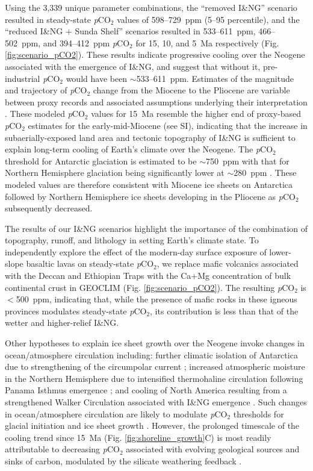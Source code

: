 \documentclass[11pt,letterpaper]{article}
\newcommand{\pCOtwo}{\textit{p}CO$_{2}$\xspace}
\begin{document}
Using the 3,339 unique parameter combinations, the ``removed I\&NG'' scenario resulted in steady-state \pCOtwo values of 598--729~ppm (5--95 percentile), and the ``reduced I\&NG + Sunda Shelf'' scenarios resulted in 533--611~ppm, 466--502~ppm, and 394--412~ppm \pCOtwo for 15, 10, and 5~Ma respectively (Fig. \ref{fig:scenario_pCO2}). These results indicate progressive cooling over the Neogene associated with the emergence of I\&NG, and suggest that without it, pre-industrial \pCOtwo would have been $\sim$533--611~ppm. Estimates of the magnitude and trajectory of \pCOtwo change from the Miocene to the Pliocene are variable between proxy records and associated assumptions underlying their interpretation \cite{Foster2017a, Mejia2017a, Ji2018a}. These modeled \pCOtwo values for 15~Ma resemble the higher end of proxy-based \pCOtwo estimates for the early-mid-Miocene (see SI), indicating that the increase in subaerially-exposed land area and tectonic topography of I\&NG is sufficient to explain long-term cooling of Earth's climate over the Neogene. The \pCOtwo threshold for Antarctic glaciation is estimated to be $\sim$750~ppm with that for Northern Hemisphere glaciation being significantly lower at $\sim$280~ppm \cite{DeConto2008a}. These modeled values are therefore consistent with Miocene ice sheets on Antarctica followed by Northern Hemisphere ice sheets developing in the Pliocene as \pCOtwo subsequently decreased.

The results of our I\&NG scenarios highlight the importance of the combination of topography, runoff, and lithology in setting Earth’s climate state. To independently explore the effect of the modern-day surface exposure of lower-slope basaltic lavas on steady-state \pCOtwo \cite{Kent2008a, Kent2013a}, we replace mafic volcanics associated with the Deccan and Ethiopian Traps with the Ca+Mg concentration of bulk continental crust in GEOCLIM (Fig. \ref{fig:scenario_pCO2}). The resulting \pCOtwo is $<$500~ppm, indicating that, while the presence of mafic rocks in these igneous provinces modulates steady-state \pCOtwo, its contribution is less than that of the wetter and higher-relief I\&NG.

Other hypotheses to explain ice sheet growth over the Neogene invoke changes in ocean/atmosphere circulation including: further climatic isolation of Antarctica due to strengthening of the circumpolar current \cite{Shevenell2004a}; increased atmospheric moisture in the Northern Hemisphere due to intensified thermohaline circulation following Panama Isthmus emergence \cite{Haug1998a}; and cooling of North America resulting from a strengthened Walker Circulation associated with I\&NG emergence \cite{Molnar2015a}. Such changes in ocean/atmosphere circulation are likely to modulate \pCOtwo thresholds for glacial initiation and ice sheet growth \cite{DeConto2008a}. However, the prolonged timescale of the cooling trend since 15~Ma (Fig. \ref{fig:shoreline_growth}C) is most readily attributable to decreasing \pCOtwo associated with evolving geological sources and sinks of carbon, modulated by the silicate weathering feedback \cite{Walker1981a, Raymo1991a, Berner1997a, Kump1997a, Berner2001a}.
\end{document}

